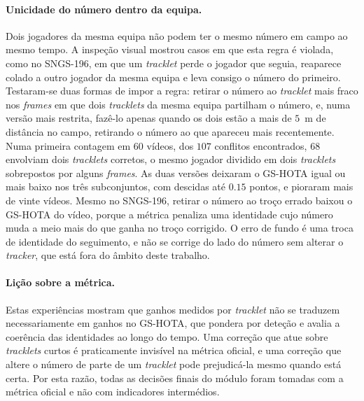 \paragraph{Unicidade do número dentro da equipa.} Dois jogadores da mesma equipa não podem ter o
mesmo número em campo ao mesmo tempo. A inspeção visual mostrou casos em que esta regra é violada,
como no SNGS-196, em que um \emph{tracklet} perde o jogador que seguia, reaparece colado a outro
jogador da mesma equipa e leva consigo o número do primeiro. Testaram-se duas formas de impor a
regra: retirar o número ao \emph{tracklet} mais fraco nos \emph{frames} em que dois
\emph{tracklets} da mesma equipa partilham o número, e, numa versão mais restrita, fazê-lo apenas
quando os dois estão a mais de $5$~m de distância no campo, retirando o número ao que apareceu mais
recentemente. Numa primeira contagem em $60$ vídeos, dos $107$ conflitos encontrados, $68$ envolviam
dois \emph{tracklets} corretos, o mesmo jogador dividido em dois \emph{tracklets} sobrepostos por
alguns \emph{frames}. As duas versões deixaram o GS-HOTA igual ou mais baixo nos três subconjuntos, com descidas até %
$0.15$ pontos, e pioraram mais de vinte vídeos. Mesmo no SNGS-196, retirar o número ao troço %
errado baixou o GS-HOTA do vídeo, porque a métrica penaliza uma identidade cujo número muda a meio
mais do que ganha no troço corrigido. O erro de fundo é uma troca de identidade do seguimento, e
não se corrige do lado do número sem alterar o \emph{tracker}, que está fora do âmbito deste
trabalho.

\paragraph{Lição sobre a métrica.} Estas experiências mostram que ganhos medidos por
\emph{tracklet} não se traduzem necessariamente em ganhos no GS-HOTA, que pondera por deteção e
avalia a coerência das identidades ao longo do tempo. Uma correção que atue sobre \emph{tracklets}
curtos é praticamente invisível na métrica oficial, e uma correção que altere o número de parte de
um \emph{tracklet} pode prejudicá-la mesmo quando está certa. Por esta razão, todas as decisões
finais do módulo foram tomadas com a métrica oficial e não com indicadores intermédios.



